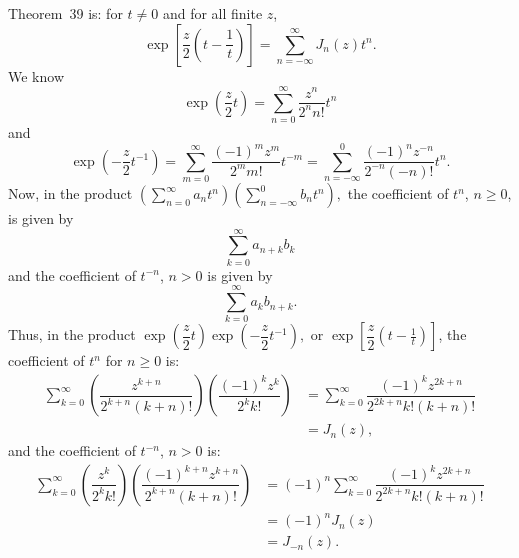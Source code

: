 \begin{solution}
Theorem~39 is: for $t\neq 0$ and for all finite $z$,
$$\exp \left[ \dfrac{z}{2}  \left(t - \frac{1}{t} \right) \right] = \displaystyle\sum_{n=-\infty}^{\infty} J_n(z) t^n.$$
We know 
$$\exp \left( \dfrac{z}{2} t \right) = \displaystyle\sum_{n=0}^{\infty} \dfrac{z^n}{2^n n!} t^n$$
and
$$\exp \left( - \dfrac{z}{2} t^{-1} \right) = \displaystyle\sum_{m=0}^{\infty} \dfrac{(-1)^m z^m}{2^m m!} t^{-m} = \displaystyle\sum_{n=-\infty}^0 \dfrac{(-1)^n z^{-n}}{2^{-n} (-n)!}t^n.$$
Now, in the product $\left( \displaystyle\sum_{n=0}^{\infty} a_n t^n \right)\left( \displaystyle\sum_{n=-\infty}^0 b_n t^n \right),$
the coefficient of $t^n$, $n \geq 0$, is given by
$$\displaystyle\sum_{k=0}^{\infty} a_{n+k}b_k$$
and the coefficient of $t^{-n}$, $n>0$ is given by
$$\displaystyle\sum_{k=0}^{\infty} a_k b_{n+k}.$$
Thus, in the product $\exp \left( \dfrac{z}{2} t \right) \exp \left( - \dfrac{z}{2} t^{-1} \right),$ or $\exp \left[ \dfrac{z}{2} \left(t - \frac{1}{t} \right) \right]$, the coefficient of $t^n$ for $n \geq 0$ is:
$$\begin{array}{ll}
\displaystyle\sum_{k=0}^{\infty} \left( \dfrac{z^{k+n}}{2^{k+n}(k+n)!} \right) \left( \dfrac{(-1)^k z^k}{2^k k!} \right) &= \displaystyle\sum_{k=0}^{\infty} \dfrac{(-1)^k z^{2k+n}}{2^{2k+n} k! (k+n)!} \\
&= J_n(z),
\end{array}$$
and the coefficient of $t^{-n}$, $n>0$ is:
$$\begin{array}{ll}
\displaystyle\sum_{k=0}^{\infty} \left( \dfrac{z^k}{2^k k!} \right) \left( \dfrac{(-1)^{k+n} z^{k+n}}{2^{k+n}(k+n)!} \right) &= (-1)^n \displaystyle\sum_{k=0}^{\infty} \dfrac{(-1)^k z^{2k+n}}{2^{2k+n}k! (k+n)!} \\
&= (-1)^n J_n(z) \\
&= J_{-n}(z).
\end{array}$$
\end{solution}
